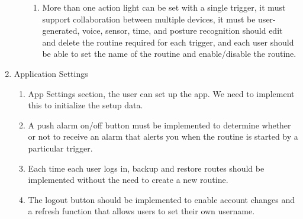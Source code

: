\documentclass[11pt, conference]{IEEEtran}
\begin{document}
\begin{enumerate}[label=\arabic*.]
\begin{enumerate}[label*={\arabic*.}]
\begin{enumerate}[label*={\arabic*.},ref=\theenumi.\arabic*]
            \item More than one action light can be set with a single trigger, it must support collaboration between multiple devices, it must be user-generated, voice, sensor, time, and posture recognition should edit and delete the routine required for each trigger, and each user should be able to set the name of the routine and enable/disable the routine.\\
    \end{enumerate}
\end{enumerate}

    \item {\large{Application Settings}}\\
    \begin{enumerate}[label*={\arabic*.},ref=\theenumi.\arabic*]
    \setlength{\itemindent}{0.5cm}
        \item App Settings section, the user can set up the app. We need to implement this to initialize the setup data.\\

        \item A push alarm on/off button must be implemented to determine whether or not to receive an alarm that alerts you when the routine is started by a particular trigger.\\

        \item Each time each user logs in, backup and restore routes should be implemented without the need to create a new routine.\\

        \item The logout button should be implemented to enable account changes and a refresh function that allows users to set their own username.\\
    \end{enumerate}
\end{enumerate}
\end{document}

